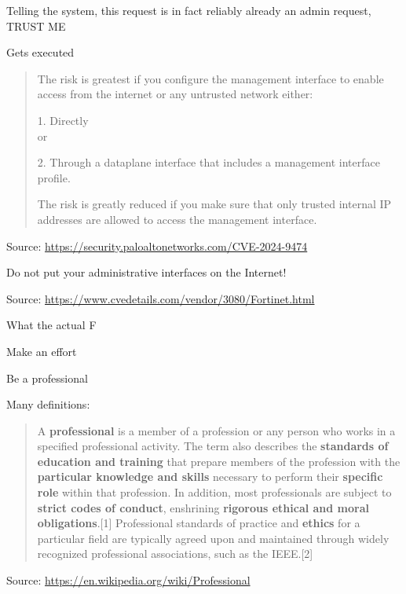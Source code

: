 \documentclass[Screen16to9,17pt]{foils}
\begin{document}
\begin{list2}
\item Telling the system, this request is in fact reliably already an admin request, TRUST ME
\item Gets executed
\end{list2}




\begin{quote}
The risk is greatest if you configure the management interface to enable access from the internet or any untrusted network either:

\begin{list2}
\item 1. Directly \\
or
\item 2. Through a dataplane interface that includes a management interface profile.
\end{list2}

The risk is greatly reduced if you make sure that only trusted internal IP addresses are allowed to access the management interface.
\end{quote}
Source: \url{https://security.paloaltonetworks.com/CVE-2024-9474}


\begin{list2}
\item Do not put your administrative interfaces on the Internet!
\end{list2}


Source: \url{https://www.cvedetails.com/vendor/3080/Fortinet.html}

\begin{list2}
\item What the actual F
\end{list2}



\begin{list2}
\item Make an effort
\item Be a professional
\end{list2}

Many definitions:
\begin{quote}
A {\bf professional} is a member of a profession or any person who works in a specified professional activity. The term also describes the {\bf standards of education and training} that prepare members of the profession with the {\bf particular knowledge and skills} necessary to perform their {\bf specific role} within that profession. In addition, most professionals are subject to {\bf strict codes of conduct}, enshrining {\bf rigorous ethical and moral obligations}.[1] Professional standards of practice and {\bf ethics} for a particular field are typically agreed upon and maintained through widely recognized professional associations, such as the IEEE.[2]
\end{quote}
Source: \url{https://en.wikipedia.org/wiki/Professional}
\end{document}
